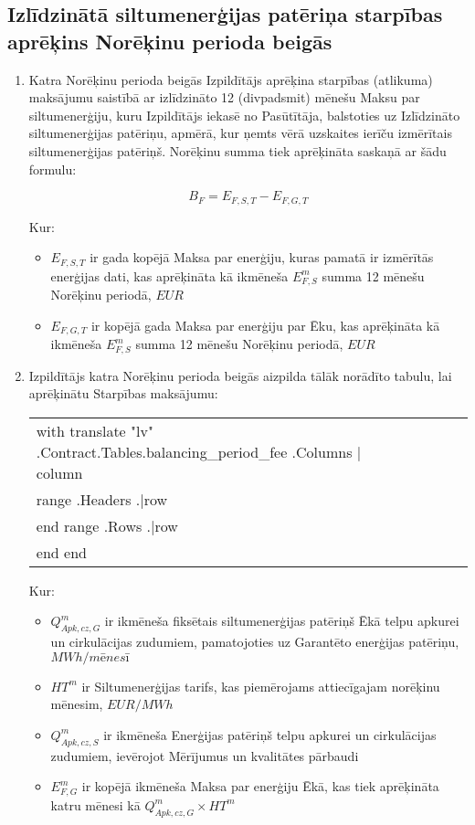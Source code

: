 \subsection{Izlīdzinātā siltumenerģijas patēriņa starpības aprēķins Norēķinu perioda beigās}
\begin{enumerate}
	\item Katra Norēķinu perioda beigās Izpildītājs aprēķina starpības (atlikuma) maksājumu saistībā ar izlīdzināto 12 (divpadsmit) mēnešu Maksu par siltumenerģiju, kuru Izpildītājs iekasē no Pasūtītāja, balstoties uz Izlīdzināto siltumenerģijas patēriņu, apmērā, kur ņemts vērā uzskaites ierīču izmērītais siltumenerģijas patēriņš. Norēķinu summa tiek aprēķināta saskaņā ar šādu formulu:

\[ B_F = E_{F,S,T} - E_{F,G,T} \]

Kur:

\begin{itemize}
	\item $E_{F,S,T}$ ir gada kopējā Maksa par enerģiju, kuras pamatā ir izmērītās enerģijas dati, kas aprēķināta kā ikmēneša $E^{m}_{F,S}$ summa 12 mēnešu Norēķinu periodā, $EUR$
	\item $E_{F,G,T}$ ir kopējā gada Maksa par enerģiju par Ēku, kas aprēķināta kā ikmēneša $E^{m}_{F,S}$ summa 12 mēnešu Norēķinu periodā, $EUR$
\end{itemize}

	\item Izpildītājs katra Norēķinu perioda beigās aizpilda tālāk norādīto tabulu, lai aprēķinātu Starpības maksājumu:


\begin{center}
\begin{tabu}{|X|X|X|X|X|X|X|} \tabucline{}
{{with translate "lv" .Contract.Tables.balancing_period_fee}} %
	{{.Columns | column}} \\\tabucline{}
	{{range .Headers}} {{.|row}} \\\tabucline{} {{end}} %
	{{range .Rows}} {{.|row}} \\\tabucline{} {{end}} %
{{end}}
\end{tabu}
\end{center}

Kur:

\begin{itemize}
	\item $Q^{m}_{Apk,cz,G}$ ir ikmēneša fiksētais siltumenerģijas patēriņš Ēkā telpu apkurei un cirkulācijas zudumiem, pamatojoties uz Garantēto enerģijas patēriņu, $MWh/mēnesī$
	\item $HT^m$ ir Siltumenerģijas tarifs, kas piemērojams attiecīgajam norēķinu mēnesim, $EUR/MWh$
	\item $Q^m_{Apk,cz,S}$ ir ikmēneša Enerģijas patēriņš telpu apkurei un cirkulācijas zudumiem, ievērojot Mērījumus un kvalitātes pārbaudi
	\item $E^m_{F,G}$ ir kopējā ikmēneša Maksa par enerģiju Ēkā, kas tiek aprēķināta katru mēnesi kā $Q^{m}_{Apk,cz,G} \times HT^{m}$
\end{itemize}


\end{enumerate}
